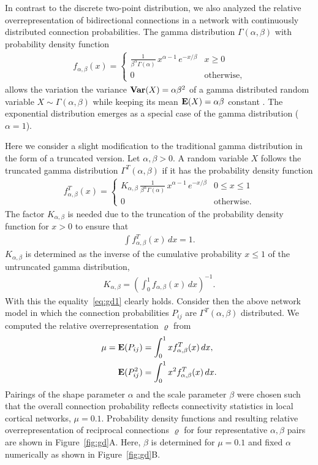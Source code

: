 
In contrast to the discrete two-point distribution, we also analyzed
the relative overrepresentation of bidirectional connections in a
network with continuously distributed connection probabilities. The
gamma distribution $\Gamma(\alpha, \beta)$ with probability density
function
\begin{align}
    f_{\alpha,\beta}(x) = \begin{cases} 
\frac{1}{\beta^{\alpha}\Gamma(\alpha)}\, x^{\alpha-1}\,e^{-x/\beta} & x \geq 0 \\
0 & \text{otherwise},
\end{cases}
\end{align}
allows the variation the variance $\operatorname{\mathbf{Var}}(X)= \alpha \beta^2 $ of a
gamma distributed random variable $X \sim \Gamma(\alpha, \beta)$ while
keeping its mean $\operatorname{\mathbf{E}}(X) = \alpha \beta $ constant \cite{Hogg1978}.
The exponential distribution emerges as a special case of the gamma
distribution ($\alpha =1$).

Here we consider a slight modification to the traditional gamma
distribution in the form of a truncated version. Let $\alpha, \beta >
0$. A random variable $X$ follows the truncated gamma distribution
$\Gamma^T(\alpha, \beta)$ if it has the probability density function
%
\begin{align}
  f_{\alpha,\beta}^T(x) = \begin{cases} K_{\alpha, \beta}\,
\frac{1}{\beta^{\alpha}\Gamma(\alpha)}\, x^{\alpha-1}\,e^{-x/\beta} & 0 \leq x \leq 1 \\
0 & \text{otherwise}.
\end{cases}
\end{align}
%
The factor $K_{\alpha,\beta}$ is needed due to the truncation of the
probability density function for $x>0$ to ensure that
\begin{align}
  \int f_{\alpha,\beta}^T(x) \,dx = 1 \label{eq:gd1}.
\end{align}
$K_{\alpha,\beta}$ is determined as the inverse of the cumulative
probability $x \leq 1$ of the untruncated gamma distribution,
\begin{align}
  K_{\alpha,\beta} = \left(\int_0^{1} f_{\alpha,\beta}(x) \, dx \right)^{-1}.
\end{align}
With this the equality~\eqref{eq:gd1} clearly holds. Consider then the
above network model in which the connection probabilities $P_{ij}$ are
$\Gamma^T(\alpha, \beta)$ distributed. We computed the relative
overrepresentation $\varrho$ from 
\begin{align}
  \mu = \operatorname{\mathbf{E}}(P_{ij}) &= \int_0^1 x f_{\alpha,\beta}^T(x)\, dx,\\
        \operatorname{\mathbf{E}}(P_{ij}^2) &= \int_0^1 x^2 f_{\alpha,\beta}^T(x)\, dx.
\end{align}
%
Pairings of the shape parameter $\alpha$ and the scale parameter
$\beta$ were chosen such that the overall connection probability
reflects connectivity statistics in local cortical networks, $\mu =
0.1$. Probability density functions and resulting relative
overrepresentation of reciprocal connections $\varrho$ for four
representative $\alpha,\beta$ pairs are shown in
Figure~\ref{fig:gd}A. Here, $\beta$ is determined for $\mu = 0.1$ and
fixed $\alpha$ numerically as shown in Figure~\ref{fig:gd}B.

